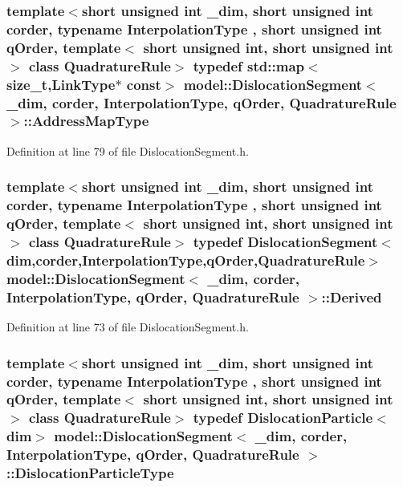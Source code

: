 \subsubsection[{Address\+Map\+Type}]{\setlength{\rightskip}{0pt plus 5cm}template$<$short unsigned int \+\_\+dim, short unsigned int corder, typename Interpolation\+Type , short unsigned int q\+Order, template$<$ short unsigned int, short unsigned int $>$ class Quadrature\+Rule$>$ typedef std\+::map$<$size\+\_\+t,{\bf Link\+Type}$\ast$ const$>$ {\bf model\+::\+Dislocation\+Segment}$<$ \+\_\+dim, corder, Interpolation\+Type, q\+Order, Quadrature\+Rule $>$\+::{\bf Address\+Map\+Type}}\label{classmodel_1_1_dislocation_segment_aabe470c119860a0360c9425a959afe04}


Definition at line 79 of file Dislocation\+Segment.\+h.

\hypertarget{classmodel_1_1_dislocation_segment_a7767d69273160000e7597366ac1dc6e8}{}
\subsubsection[{Derived}]{\setlength{\rightskip}{0pt plus 5cm}template$<$short unsigned int \+\_\+dim, short unsigned int corder, typename Interpolation\+Type , short unsigned int q\+Order, template$<$ short unsigned int, short unsigned int $>$ class Quadrature\+Rule$>$ typedef {\bf Dislocation\+Segment}$<${\bf dim},corder,Interpolation\+Type,q\+Order,Quadrature\+Rule$>$ {\bf model\+::\+Dislocation\+Segment}$<$ \+\_\+dim, corder, Interpolation\+Type, q\+Order, Quadrature\+Rule $>$\+::{\bf Derived}}\label{classmodel_1_1_dislocation_segment_a7767d69273160000e7597366ac1dc6e8}


Definition at line 73 of file Dislocation\+Segment.\+h.

\hypertarget{classmodel_1_1_dislocation_segment_ae5ede42f748e4f51479ce6891135b5e1}{}
\subsubsection[{Dislocation\+Particle\+Type}]{\setlength{\rightskip}{0pt plus 5cm}template$<$short unsigned int \+\_\+dim, short unsigned int corder, typename Interpolation\+Type , short unsigned int q\+Order, template$<$ short unsigned int, short unsigned int $>$ class Quadrature\+Rule$>$ typedef {\bf Dislocation\+Particle}$<${\bf dim}$>$ {\bf model\+::\+Dislocation\+Segment}$<$ \+\_\+dim, corder, Interpolation\+Type, q\+Order, Quadrature\+Rule $>$\+::{\bf Dislocation\+Particle\+Type}}\label{classmodel_1_1_dislocation_segment_ae5ede42f748e4f51479ce6891135b5e1}


